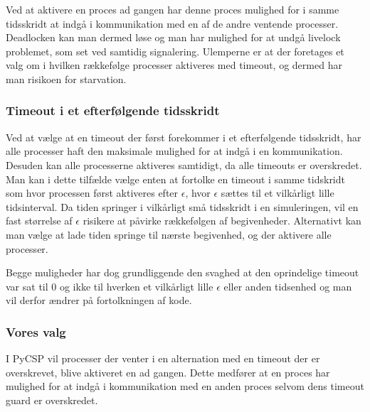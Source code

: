 \begin{shaded}
Ved at aktivere en proces ad gangen har denne proces mulighed for i
samme tidsskridt at indgå i kommunikation med en af de andre ventende
processer. Deadlocken kan man dermed løse og man har mulighed for at
undgå livelock problemet, som set ved samtidig signalering. Ulemperne er at der
foretages et valg om i hvilken rækkefølge  processer aktiveres med timeout,
og dermed har man risikoen for starvation.


\subsubsection{Timeout i et efterfølgende tidsskridt} 
Ved at vælge at en timeout der først forekommer i et efterfølgende tidsskridt, har alle
processer haft den maksimale mulighed for at indgå i en kommunikation.
Desuden kan alle processerne aktiveres samtidigt, da  alle timeouts
er overskredet. Man kan i dette tilfælde  vælge enten at fortolke en timeout i samme
tidskridt som hvor processen først aktiveres efter $\epsilon$, hvor $\epsilon$ sættes til
et vilkårligt lille tidsinterval. Da tiden springer i vilkårligt små
tidsskridt i en simuleringen, vil en fast størrelse af $\epsilon$
risikere at påvirke rækkefølgen af begivenheder. Alternativt kan man vælge
at lade tiden springe til nærste begivenhed, og der aktivere alle processer.

Begge muligheder har dog grundliggende den svaghed at den oprindelige timeout var sat til
0 og ikke til hverken et vilkårligt lille $\epsilon$ eller anden
tidsenhed og man vil derfor ændrer på fortolkningen af kode. 
\subsubsection{Vores valg}
I PyCSP vil processer der venter i en alternation med en timeout der er overskrevet, blive aktiveret en ad gangen. Dette
medfører at en proces har mulighed for at indgå i kommunikation med en anden proces selvom dens timeout guard er overskredet. 
\end{shaded}

